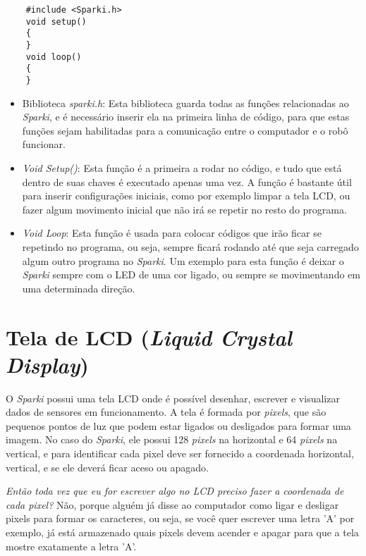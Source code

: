     \begin{verbatim}
    #include <Sparki.h>
    void setup()
    {
    }
    void loop()
    {
    }
    \end{verbatim}

    \begin{itemize}
        \item Biblioteca \textit{sparki.h}: Esta biblioteca guarda todas as funções relacionadas ao \textit{Sparki}, e é necessário inserir ela na primeira linha de código, para que estas funções sejam habilitadas para a comunicação entre o computador e o robô funcionar.
        \item \textit{Void Setup()}: Esta função é a primeira a rodar no código, e tudo que está dentro de suas chaves é executado apenas uma vez. A função é bastante útil para inserir configurações iniciais, como por exemplo limpar a tela LCD, ou fazer algum movimento inicial que não irá se repetir no resto do programa.
        \item \textit{Void Loop}: Esta função é usada para colocar códigos que irão ficar se repetindo no programa, ou seja, sempre ficará rodando até que seja carregado algum outro programa no \textit{Sparki}. Um exemplo para esta função é deixar o \textit{Sparki} sempre com o LED de uma cor ligado, ou sempre se movimentando em uma determinada direção.
        \end{itemize}
    

\section{Tela de LCD (\textit{Liquid Crystal Display})}
O \textit{Sparki} possui uma tela LCD onde é possível desenhar, escrever e visualizar dados de sensores em funcionamento. A tela é formada por \textit{pixels}, que são pequenos pontos de luz que podem estar ligados ou desligados para formar uma imagem. No caso do \textit{Sparki}, ele possui 128 \textit{pixels} na horizontal e 64 \textit{pixels} na vertical, e para identificar cada pixel deve ser fornecido a coordenada horizontal, vertical, e se ele deverá ficar aceso ou apagado. \par
\textit{Então toda vez que eu for escrever algo no LCD preciso fazer a coordenada de cada pixel?}
Não, porque alguém já disse ao computador como ligar e desligar pixels para formar os caracteres, ou seja, se você quer escrever uma letra 'A' por exemplo, já está armazenado quais pixels devem acender e apagar para que a tela mostre exatamente a letra 'A'.

